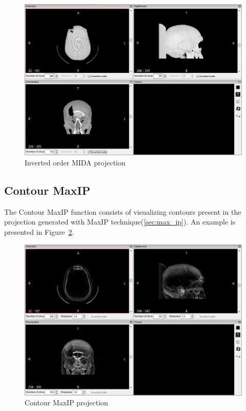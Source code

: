 \begin{figure}[!h]
\centering
\includegraphics[scale=0.40]{../user_guide_figures/invesalius_screen/multiplanar_window_mida_inverted_en.png}
\caption{Inverted order MIDA projection}
\label{fig:proj_MIDA_inv}
\end{figure}

\subsection{Contour MaxIP}

The Contour MaxIP function consists of visualizing contours present in the projection generated with MaxIP technique(\ref{sec:max_ip}). An example is presented in Figure~\ref{fig:proj_contorno_maxip}.

\begin{figure}[!h]
\centering
\includegraphics[scale=0.40]{../user_guide_figures/invesalius_screen/multiplanar_window_contour_maxip_en.png}
\caption{Contour MaxIP projection}
\label{fig:proj_contorno_maxip}
\end{figure}

